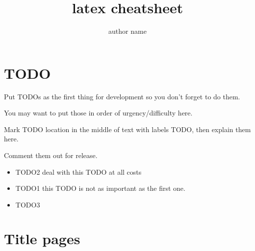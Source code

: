 \documentclass[12pt]{article}
\title{latex cheatsheet}
\author{author name}
\begin{document}
\tableofcontents
\newpage

\section{TODO}

\begin{remark}
	Put TODOs as the first \label{TODO2} thing for development so you don't forget to do them.
	
	You may want to put those in order of urgency/difficulty here.
	
	Mark TODO location in \label{TODO1} the middle of text with labels TODO, then explain them here.
	
	Comment them out for release.
\end{remark}

\begin{itemize}
  \item TODO2 deal with this TODO at all costs
  \item TODO1 this TODO is not as important as the first one.
  \item TODO3
\end{itemize}

\section{Title pages} \label{title-pages}

\maketitle
\newpage
\end{document}
